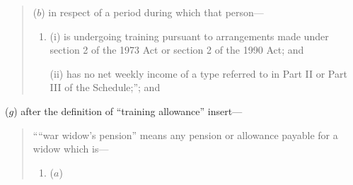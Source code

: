 \documentclass[12pt,a4paper]{article}
\begin{document}
\begin{enumerate}
\begin{quotation}
\begin{enumerate}
($b$) 
in respect of a period during which that person—
\begin{enumerate}\item[]
(i) 
is undergoing training pursuant to arrangements made under section 2 of the 1973 Act or section 2 of the 1990 Act; and

(ii) 
has no net weekly income of a type referred to in Part II or Part III of the Schedule;”; and
\end{enumerate}
\end{enumerate}
\end{quotation}

($g$) after the definition of “training allowance” insert—
\begin{quotation}
““war widow’s pension” means any pension or allowance payable for a widow which is—
\begin{enumerate}\item[]
($a$) 

\end{enumerate}
\end{quotation}
\end{enumerate}
\end{document}
